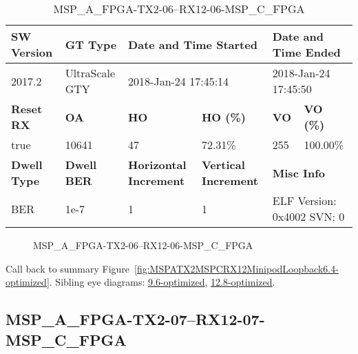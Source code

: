 \begin{table}[h]
\centering
\caption{MSP\_A\_FPGA-TX2-06--RX12-06-MSP\_C\_FPGA}
\label{tab:MSPAFPGATX206RX1206MSPCFPGA6.4-optimized}
\begin{tabular}{@{}|l|l|l|l|l|l|@{}}
\toprule
\textbf{SW Version}                & \textbf{GT Type}   & \multicolumn{2}{l|}{\textbf{Date and Time Started}}            & \multicolumn{2}{l|}{\textbf{Date and Time Ended}}        \\ \midrule
2017.2                       & UltraScale GTY          & \multicolumn{2}{l|}{2018-Jan-24 17:45:14}                   & \multicolumn{2}{l|}{2018-Jan-24 17:45:50}               \\ \midrule
\textbf{Reset RX}                  & \textbf{OA} & \textbf{HO}   & \textbf{HO (\%)} & \textbf{VO} & \textbf{VO (\%)} \\ \midrule
true & 10641        & 47          & 72.31\%        & 255        & 100.00\%       \\ \midrule
\textbf{Dwell Type}                & \textbf{Dwell BER} & \textbf{Horizontal Increment} & \textbf{Vertical Increment}    & \multicolumn{2}{l|}{\textbf{Misc Info}}                  \\ \midrule
BER                            & 1e-7        & 1        & 1           & \multicolumn{2}{l|}{ELF Version: 0x4002 SVN: 0}                         \\ \bottomrule
\end{tabular}
\end{table}

\begin{figure}[h]
\caption{MSP\_A\_FPGA-TX2-06--RX12-06-MSP\_C\_FPGA} \label{fig:MSPAFPGATX206RX1206MSPCFPGA6.4-optimized}
\end{figure}

Call back to summary Figure~\ref{fig:MSPATX2MSPCRX12MinipodLoopback6.4-optimized}.
Sibling eye diagrams: \hyperref[sec:MSPAFPGATX206RX1206MSPCFPGA9.6-optimized]{9.6-optimized}, \hyperref[sec:MSPAFPGATX206RX1206MSPCFPGA12.8-optimized]{12.8-optimized}.

\clearpage
\newpage


\subsection{MSP\_A\_FPGA-TX2-07--RX12-07-MSP\_C\_FPGA}\label{sec:MSPAFPGATX207RX1207MSPCFPGA6.4-optimized}

